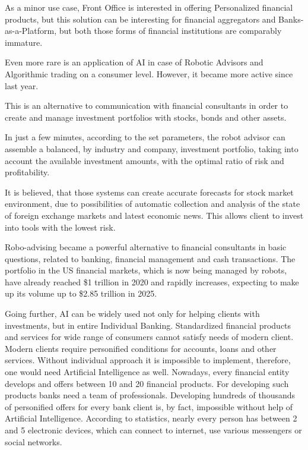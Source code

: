 As a minor use case, Front Office is interested in offering Personalized financial products, but this solution can be interesting for financial aggregators and Banks-as-a-Platform, but both those forms of financial institutions are comparably immature.

Even more rare is an application of AI in case of Robotic Advisors and Algorithmic trading on a consumer level.
However, it became more active since last year.

This is an alternative to communication with financial consultants in order to create and manage investment portfolios
with stocks, bonds and other assets.

In just a few minutes, according to the set parameters, the robot advisor can assemble a balanced, by industry and company, investment portfolio, taking into account the available investment amounts, with the optimal ratio of risk and profitability.

It is believed, that those systems can create accurate forecasts for stock market environment, due to possibilities of
automatic collection and analysis of the state of foreign exchange markets and latest economic news.
This allows client to invest into tools with the lowest risk.

Robo-advising became a powerful alternative to financial consultants in basic questions, related to banking, financial management and cash transactions.
The portfolio in the US financial markets, which is now being managed by robots, have already reached \$1 trillion in 2020
and rapidly increases, expecting to make up its volume up to \$2.85 trillion in 2025.
\cite{europarl_roboadvisors}

Going further, AI can be widely used not only for helping clients with investments, but in entire Individual Banking.
Standardized financial products and services for wide range of consumers cannot satisfy needs of modern client.
Modern clients require personified conditions for accounts, loans and other services. 
Without individual approach it is impossible to implement, therefore, one would need Artificial Intelligence as well.
Nowadays, every financial entity develops and offers between 10 and 20 financial products.
For developing such products banks need a team of professionals.
Developing hundreds of thousands of personified offers for every bank client is, by fact, impossible without help of Artificial Intelligence.
According to statistics, nearly every person has between 2 and 5 electronic devices, which can connect to internet, use various messengers or social networks.

